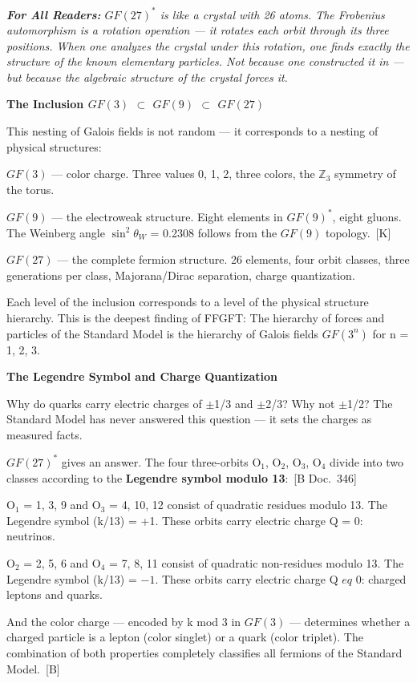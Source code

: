 \documentclass[11pt,oneside]{book}
\newcommand{\status}[1]{\penalty10000\,{\scriptsize\textcolor{gray!60}{[#1]}}}
\newenvironment{laierspur}{%
  \par\vspace{4pt}%
  \noindent\small\itshape\color{blue!60!black}%
  \textbf{For All Readers:}\enspace\ignorespaces}{%
  \par\vspace{4pt}\normalsize\normalfont\normalcolor}
\begin{document}
\begin{laierspur}
$GF(27)^*$ is like a crystal with 26 atoms. The Frobenius automorphism is a
rotation operation — it rotates each orbit through its three positions. When
one analyzes the crystal under this rotation, one finds exactly the
structure of the known elementary particles. Not because one constructed it
in — but because the algebraic structure of the crystal forces it.
\end{laierspur}

\textbf{The Inclusion $GF(3)$ $\subset$ $GF(9)$ $\subset$ $GF(27)$}

This nesting of Galois fields is not random — it corresponds to a nesting
of physical structures:

$GF(3)$ — color charge. Three values {0, 1, 2}, three colors, the $\mathbb{Z}_3$ symmetry
of the torus.

$GF(9)$ — the electroweak structure. Eight elements in $GF(9)^*$, eight gluons.
The Weinberg angle $\sin^2\theta_W$ = 0.2308 follows from the $GF(9)$ topology. \status{K}

$GF(27)$ — the complete fermion structure. 26 elements, four orbit classes,
three generations per class, Majorana/Dirac separation, charge quantization.

Each level of the inclusion corresponds to a level of the physical structure
hierarchy. This is the deepest finding of FFGFT: The hierarchy of forces and
particles of the Standard Model is the hierarchy of Galois fields $GF(3^n)$
for n = 1, 2, 3.

\textbf{The Legendre Symbol and Charge Quantization}

Why do quarks carry electric charges of $\pm$1/3 and $\pm$2/3? Why not $\pm$1/2?
The Standard Model has never answered this question — it sets the charges as
measured facts.

$GF(27)^*$ gives an answer. The four three-orbits O$_1$, O$_2$, O$_3$, O$_4$ divide
into two classes according to the \textbf{Legendre symbol modulo 13}: \status{B Doc.~346}

O$_1$ = {1, 3, 9} and O$_3$ = {4, 10, 12} consist of quadratic residues
modulo 13. The Legendre symbol (k/13) = +1. These orbits carry electric
charge Q = 0: neutrinos.

O$_2$ = {2, 5, 6} and O$_4$ = {7, 8, 11} consist of quadratic non-residues
modulo 13. The Legendre symbol (k/13) = $-1$. These orbits carry electric
charge Q $
eq$ 0: charged leptons and quarks.

And the color charge — encoded by k mod 3 in $GF(3)$ — determines whether a
charged particle is a lepton (color singlet) or a quark (color triplet).
The combination of both properties completely classifies all fermions of the
Standard Model. \status{B}
\end{document}
